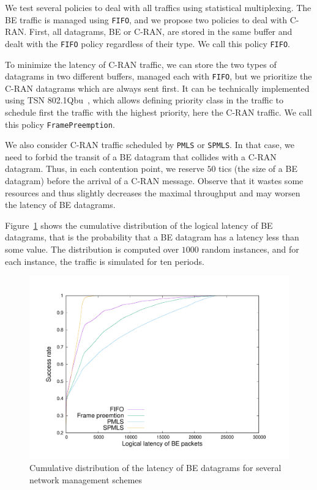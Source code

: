 \documentclass[a4paper,10pt]{journal}
\newcommand\PMLS{\texttt{PMLS}\xspace}
\newcommand\SPMLS{\texttt{SPMLS}\xspace}
\newcommand\FIFO{\texttt{FIFO}\xspace}
\newcommand\framepre{\texttt{FramePreemption}\xspace}
\begin{document}
    We test several policies to deal with all traffics using statistical multiplexing.
   	The BE traffic is managed using \FIFO, and we propose two policies to deal with C-RAN. First, all datagrams, BE or C-RAN, are stored in the same buffer and dealt with the \FIFO policy regardless of their type. We call this policy \FIFO.

    To minimize the latency of C-RAN traffic, we can store the two types of datagrams in two different buffers, managed each with \FIFO, but we prioritize the C-RAN datagrams which are always sent first. It can be technically implemented using TSN 802.1Qbu~\cite{ieee802}, which allows defining priority class in the traffic to schedule first the traffic with the highest priority, here the C-RAN traffic. We call this policy \framepre.
   
   We also consider C-RAN traffic scheduled by \PMLS or \SPMLS. In that case, we need to forbid the transit of a BE datagram that collides with a C-RAN datagram. Thus, in each contention point, we reserve $50$ tics (the size of a BE datagram) before the arrival of a C-RAN message. Observe that it wastes some resources and thus slightly decreases the maximal throughput and may worsen the latency of BE datagrams.
    
    Figure~\ref{fig:belatency} shows the cumulative distribution of the logical latency of BE datagrams, that is the probability that a BE datagram has a latency less than some value.
    The distribution is computed over $1000$ random instances, and for each instance, the traffic is simulated for ten periods.

     \begin{figure}
       \begin{center}
      \includegraphics[width = 1\textwidth]{res.pdf}
      \end{center}
      \caption{Cumulative distribution of the latency of BE datagrams for several network management schemes}
      \label{fig:belatency}   
     \end{figure}    
     
\end{document}
